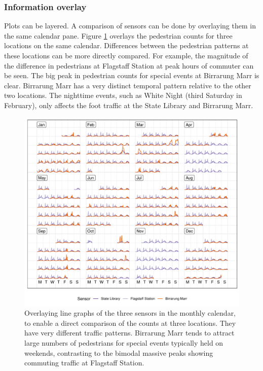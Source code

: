 \documentclass[12pt]{article}
\begin{document}
\hypertarget{information-overlay}{%
\subsubsection{Information overlay}\label{information-overlay}}

Plots can be layered. A comparison of sensors can be done by overlaying them in the same calendar pane. Figure \ref{fig:overlay} overlays the pedestrian counts for three locations on the same calendar. Differences between the pedestrian patterns at these locations can be more directly compared. For example, the magnitude of the difference in pedestrians at Flagstaff Station at peak hours of commuter can be seen. The big peak in pedestrian counts for special events at Birrarung Marr is clear. Birrarung Marr has a very distinct temporal pattern relative to the other two locations. The nighttime events, such as White Night (third Saturday in February), only affects the foot traffic at the State Library and Birrarung Marr.

\begin{figure}

{\centering \includegraphics[width=\textwidth]{figure/overlay-1} 

}

\caption{Overlaying line graphs of the three sensors in the monthly calendar, to enable a direct comparison of the counts at three locations. They have very different traffic patterns. Birrarung Marr tends to attract large numbers of pedestrians for special events typically held on weekends, contrasting to the bimodal massive peaks showing commuting traffic at Flagstaff Station.}\label{fig:overlay}
\end{figure}
\end{document}
